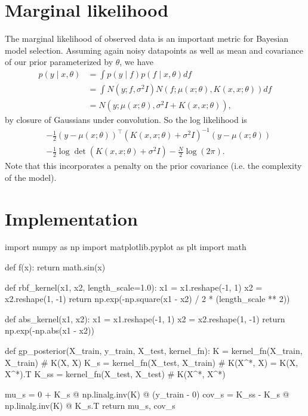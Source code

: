 \documentclass{article}
\begin{document}
\section{Marginal likelihood}
The marginal likelihood of observed data is an important metric for Bayesian model selection. Assuming again noisy datapoints as well as mean and covariance of our prior parameterized by $\theta $, we have 
\begin{align*}
    p(y \mid x, \theta ) &= \int p(y \mid f) p(f \mid x, \theta ) df\\
    &= \int N(y; f, \sigma ^2 I) N(f; \mu (x;\theta ), K(x, x; \theta )) df\\
    &= N(y; \mu (x; \theta ), \sigma ^2 I + K(x, x;\theta )), 
\end{align*}
by closure of Gaussians under convolution. So the log likelihood is 
\begin{align*}
    &- \frac{1}{2}(y-\mu (x;\theta ))^{\top} (K(x, x;\theta ) 
    + \sigma ^2 I)^{-1} (y-\mu (x; \theta )) \\&- \frac{1}{2}\log \det (K(x, x; \theta ) + \sigma ^2 I) - \frac{N}{2}\log (2\pi ). 
\end{align*}
Note that this incorporates a penalty on the prior covariance (i.e. the complexity of the model). 

\section{Implementation}
\begin{python}
import numpy as np
import matplotlib.pyplot as plt
import math

def f(x):
  return math.sin(x)

def rbf_kernel(x1, x2, length_scale=1.0):
  x1 = x1.reshape(-1, 1)
  x2 = x2.reshape(1, -1)
  return np.exp(-np.square(x1 - x2) / 2 * (length_scale ** 2))

def abs_kernel(x1, x2):
  x1 = x1.reshape(-1, 1)
  x2 = x2.reshape(1, -1)
  return np.exp(-np.abs(x1 - x2))

def gp_posterior(X_train, y_train, X_test, kernel_fn):
  K = kernel_fn(X_train, X_train)  # K(X, X)
  K_s = kernel_fn(X_test, X_train) # K(X^*, X) = K(X, X^*).T
  K_ss = kernel_fn(X_test, X_test) # K(X^*, X^*)

  mu_s = 0 + K_s @ np.linalg.inv(K) @ (y_train - 0)
  cov_s = K_ss - K_s @ np.linalg.inv(K) @ K_s.T
  return mu_s, cov_s
\end{python}
\end{document}
